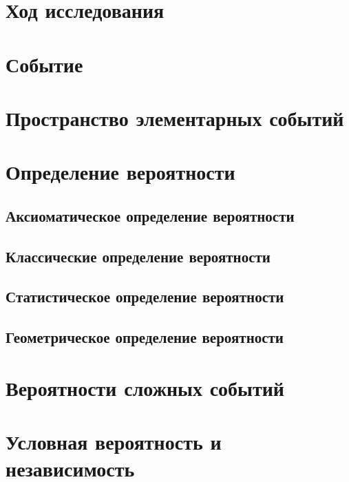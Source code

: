 \documentclass[
  letterpaper,
  DIV=11,
  numbers=noendperiod]{scrreprt}
\theoremstyle{definition}
\theoremstyle{remark}
\begin{document}
\section{Ход исследования}\label{stats-rand-exp-research}

\section{Событие}\label{stats-rand-exp-event}

\section{Пространство элементарных событий}\label{stats-rand-exp-space}

\section{Определение вероятности}\label{stats-rand-exp-prob-def}

\subsection{Аксиоматическое определение
вероятности}\label{stats-rand-exp-prob-def-axoim}

\subsection{Классические определение
вероятности}\label{stats-rand-exp-prob-def-classic}

\subsection{Статистическое определение
вероятности}\label{stats-rand-exp-prob-def-stats}

\subsection{Геометрическое определение
вероятности}\label{stats-rand-exp-prob-def-geom}

\section{Вероятности сложных событий}\label{stats-rand-exp-prob-complex}

\section{Условная вероятность и
независимость}\label{stats-rand-exp-prob-cond}
\end{document}
